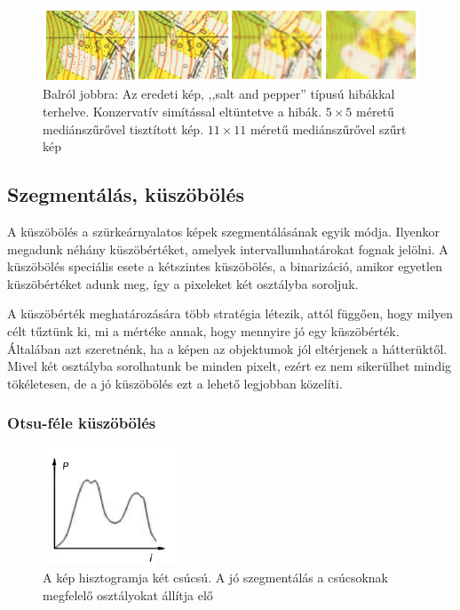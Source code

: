 \documentclass[a4paper,12pt]{article}
\begin{document}
\begin{figure}
	\centering
	\includegraphics[width=14cm]{konzerv.png}
	\caption{Balról jobbra: Az eredeti kép, ,,salt and pepper'' típusú hibákkal terhelve. Konzervatív simítással eltüntetve a hibák. $5\times5$ méretű mediánszűrővel tisztított kép. $11\times11$ méretű mediánszűrővel szűrt kép}
	\label{fig:konzerv}
\end{figure}




\subsection{Szegmentálás, küszöbölés} 

A küszöbölés a szürkeárnyalatos képek szegmentálásának egyik módja. Ilyenkor
megadunk néhány küszöbértéket, amelyek intervallumhatárokat fognak jelölni. A
küszöbölés speciális esete a kétszintes küszöbölés, a binarizáció, amikor
egyetlen küszöbértéket adunk meg, így a pixeleket két osztályba soroljuk. 

A küszöbérték meghatározására több stratégia létezik, attól függően, hogy milyen
célt tűztünk ki, mi a mértéke annak, hogy mennyire jó egy küszöbérték. Általában
azt szeretnénk, ha a képen az objektumok jól eltérjenek a hátterüktől. Mivel két
osztályba sorolhatunk be minden pixelt, ezért ez nem sikerülhet mindig
tökéletesen, de a jó küszöbölés ezt a lehető legjobban közelíti. 

\subsubsection{Otsu-féle küszöbölés}


\begin{figure}
	\centering
	\includegraphics[width=4cm]{otsu.png}
	\caption{A kép hisztogramja két csúcsú. A jó szegmentálás a csúcsoknak megfelelő osztályokat állítja elő}
	\label{fig:otsu}
\end{figure}
\end{document}
